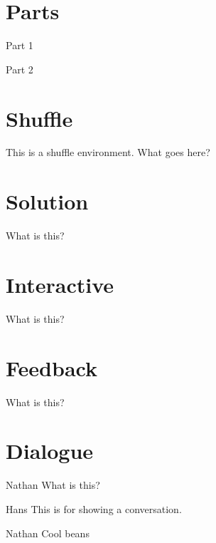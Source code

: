 \documentclass{ximera}
\begin{document}
\section{Parts}

\begin{parts} %
\item Part 1
\item Part 2
\end{parts}



\section{Shuffle}

\begin{shuffle}
This is a shuffle environment. What goes here?
\end{shuffle}



\section{Solution}

\begin{solution} %
What is this?
\end{solution}



\section{Interactive}

\begin{interactive}
What is this?
\end{interactive}



\section{Feedback}

\begin{feedback}
What is this?
\end{feedback}



\section{Dialogue}

\begin{dialogue}
\item[Nathan] What is this?
\item[Hans] This is for showing a conversation.
\item[Nathan] Cool beans
\end{dialogue}
\end{document}
